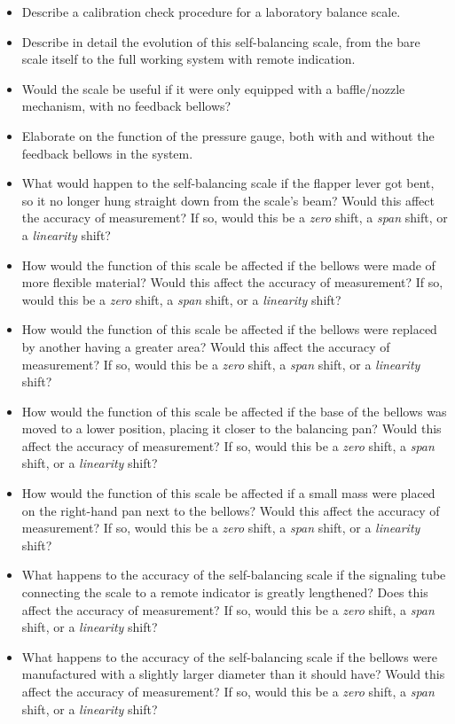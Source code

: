 \begin{itemize}
\item{} Describe a calibration check procedure for a laboratory balance scale.
\item{} Describe in detail the evolution of this self-balancing scale, from the bare scale itself to the full working system with remote indication.
\item{} Would the scale be useful if it were only equipped with a baffle/nozzle mechanism, with no feedback bellows?
\item{} Elaborate on the function of the pressure gauge, both with and without the feedback bellows in the system.
\item{} What would happen to the self-balancing scale if the flapper lever got bent, so it no longer hung straight down from the scale's beam?  Would this affect the accuracy of measurement?  If so, would this be a {\it zero} shift, a {\it span} shift, or a {\it linearity} shift?
\item{} How would the function of this scale be affected if the bellows were made of more flexible material?  Would this affect the accuracy of measurement?  If so, would this be a {\it zero} shift, a {\it span} shift, or a {\it linearity} shift?
\item{} How would the function of this scale be affected if the bellows were replaced by another having a greater area?  Would this affect the accuracy of measurement?  If so, would this be a {\it zero} shift, a {\it span} shift, or a {\it linearity} shift?
\item{} How would the function of this scale be affected if the base of the bellows was moved to a lower position, placing it closer to the balancing pan?  Would this affect the accuracy of measurement?  If so, would this be a {\it zero} shift, a {\it span} shift, or a {\it linearity} shift?
\item{} How would the function of this scale be affected if a small mass were placed on the right-hand pan next to the bellows?  Would this affect the accuracy of measurement?  If so, would this be a {\it zero} shift, a {\it span} shift, or a {\it linearity} shift?
\item{} What happens to the accuracy of the self-balancing scale if the signaling tube connecting the scale to a remote indicator is greatly lengthened?  Does this affect the accuracy of measurement?  If so, would this be a {\it zero} shift, a {\it span} shift, or a {\it linearity} shift?
\item{} What happens to the accuracy of the self-balancing scale if the bellows were manufactured with a slightly larger diameter than it should have?  Would this affect the accuracy of measurement?  If so, would this be a {\it zero} shift, a {\it span} shift, or a {\it linearity} shift?
\end{itemize}





